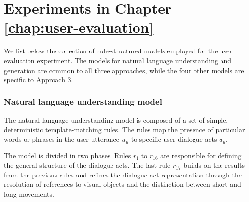 \section{Experiments in Chapter \ref{chap:user-evaluation}}
\label{sec:domainspecs-usereval}

We list below the collection of rule-structured models employed for the user evaluation experiment.  The models for natural language understanding and generation are common to all three approaches, while the four other models are specific to Approach 3.

\subsubsection*{Natural language understanding model}

The natural language understanding model is composed of a set of simple, deterministic template-matching rules.  The rules map the presence of particular words or phrases in the user utterance $u_u$ to specific user dialogue acts $a_u$. 

The model is divided in two phases.  Rules $r_1$ to $r_{16}$ are responsible for defining the general structure of the dialogue acts.  The last rule $r_{17}$ builds on the results from the previous rules and refines the dialogue act representation through the resolution of references to visual objects and the distinction between short and long movements. 

